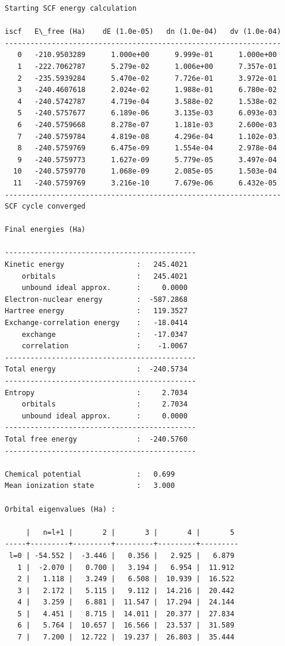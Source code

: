 \documentclass[preprint,aps]{revtex4-2}
\begin{document}
    \begin{Verbatim}[commandchars=\\\{\}]
Starting SCF energy calculation

iscf   E\_free (Ha)    dE (1.0e-05)   dn (1.0e-04)   dv (1.0e-04)
-----------------------------------------------------------------
   0   -210.9503289      1.000e+00      9.999e-01      1.000e+00
   1   -222.7062787      5.279e-02      1.006e+00      7.357e-01
   2   -235.5939284      5.470e-02      7.726e-01      3.972e-01
   3   -240.4607618      2.024e-02      1.988e-01      6.780e-02
   4   -240.5742787      4.719e-04      3.588e-02      1.538e-02
   5   -240.5757677      6.189e-06      3.135e-03      6.093e-03
   6   -240.5759668      8.278e-07      1.181e-03      2.600e-03
   7   -240.5759784      4.819e-08      4.296e-04      1.102e-03
   8   -240.5759769      6.475e-09      1.554e-04      2.978e-04
   9   -240.5759773      1.627e-09      5.779e-05      3.497e-04
  10   -240.5759770      1.068e-09      2.085e-05      1.503e-04
  11   -240.5759769      3.216e-10      7.679e-06      6.432e-05
-----------------------------------------------------------------
SCF cycle converged

Final energies (Ha)

---------------------------------------------
Kinetic energy                 :   245.4021
    orbitals                   :   245.4021
    unbound ideal approx.      :     0.0000
Electron-nuclear energy        :  -587.2868
Hartree energy                 :   119.3527
Exchange-correlation energy    :   -18.0414
    exchange                   :   -17.0347
    correlation                :    -1.0067
---------------------------------------------
Total energy                   :  -240.5734
---------------------------------------------
Entropy                        :     2.7034
    orbitals                   :     2.7034
    unbound ideal approx.      :     0.0000
---------------------------------------------
Total free energy              :  -240.5760
---------------------------------------------

Chemical potential             :   0.699
Mean ionization state          :   3.000

Orbital eigenvalues (Ha) :

     |   n=l+1 |       2 |       3 |       4 |       5
-----+---------+---------+---------+---------+---------
 l=0 | -54.552 |  -3.446 |   0.356 |   2.925 |   6.879
   1 |  -2.070 |   0.700 |   3.194 |   6.954 |  11.912
   2 |   1.118 |   3.249 |   6.508 |  10.939 |  16.522
   3 |   2.172 |   5.115 |   9.112 |  14.216 |  20.442
   4 |   3.259 |   6.881 |  11.547 |  17.294 |  24.144
   5 |   4.451 |   8.715 |  14.011 |  20.377 |  27.834
   6 |   5.764 |  10.657 |  16.566 |  23.537 |  31.589
   7 |   7.200 |  12.722 |  19.237 |  26.803 |  35.444



\end{Verbatim}
\end{document}

